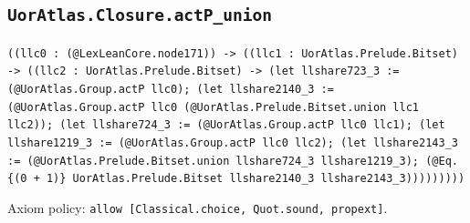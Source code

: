 \documentclass[11pt]{article}
\begin{document}
\subsection*{\texttt{UorAtlas.Closure.actP\_union}}
\noindent\texttt{((llc0 : (@LexLeanCore.node171)) -> ((llc1 : UorAtlas.Prelude.Bitset) -> ((llc2 : UorAtlas.Prelude.Bitset) -> (let llshare723\_3 := (@UorAtlas.Group.actP llc0); (let llshare2140\_3 := (@UorAtlas.Group.actP llc0 (@UorAtlas.Prelude.Bitset.union llc1 llc2)); (let llshare724\_3 := (@UorAtlas.Group.actP llc0 llc1); (let llshare1219\_3 := (@UorAtlas.Group.actP llc0 llc2); (let llshare2143\_3 := (@UorAtlas.Prelude.Bitset.union llshare724\_3 llshare1219\_3); (@Eq.\{(0 + 1)\} UorAtlas.Prelude.Bitset llshare2140\_3 llshare2143\_3)))))))))}\par
\noindent Axiom policy: \texttt{allow [Classical.choice, Quot.sound, propext]}.\par
\end{document}
